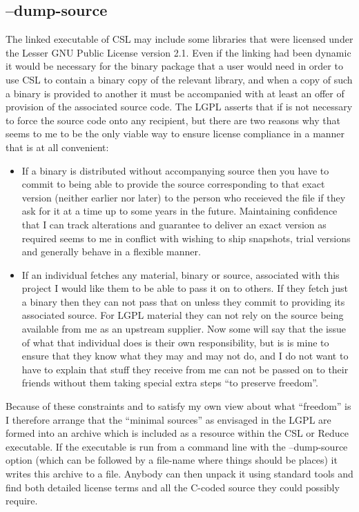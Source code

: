 \documentclass[a4paper,11pt]{article}
\begin{document}
\subsection{\ttfamily --dump-source}
The linked executable of CSL may include some libraries that were licensed
under the Lesser GNU Public License version 2.1. Even if the linking had
been dynamic it would be necessary for the binary package that a user would
need in order to use CSL to contain a binary copy of the relevant library, and
when a copy of such a binary is provided to another it must be accompanied with
at least an offer of provision of the associated source code. The LGPL
asserts that if is not necessary to force the source code onto any recipient,
but there are two reasons why that seems to me to be the only viable way to
ensure license compliance in a manner that is at all convenient:
\begin{itemize}
\item If a binary is distributed without accompanying source then you have to
commit to being able to provide the source corresponding to that exact version
(neither earlier nor later) to the person who receieved the file if they ask for
it at a time up to some years in the future. Maintaining confidence that I can
track alterations and guarantee to deliver an exact version as required seems
to me in conflict with wishing to ship snapshots, trial versions and generally
behave in a flexible manner.
\item If an individual fetches any material, binary or source, associated with
this project I would like them to be able to pass it on to others. If they
fetch just a binary then they can not pass that on unless they commit to
providing its associated source. For LGPL material they can not rely on the
source being available from me as an upstream supplier. Now some will say that
the issue of what that individual does is their own responsibility, but is is
mine to ensure that they know what they may and may not do, and I do not want
to have to explain that stuff they receive from me can not be passed on to
their friends without them taking special extra steps ``to preserve freedom''.
\end{itemize}

Because of these constraints and to satisfy my own view about what ``freedom''
is I therefore arrange that the ``minimal sources'' as envisaged in the LGPL
are formed into an archive which is included as a resource within the CSL or
Reduce executable. If the executable is run from a command line with the
{\ttfamily --dump-source} option (which can be followed by a file-name where
things should be places) it writes this archive to a file. Anybody can then
unpack it using standard tools and find both detailed license terms and all
the C-coded source they could possibly require.
\end{document}
